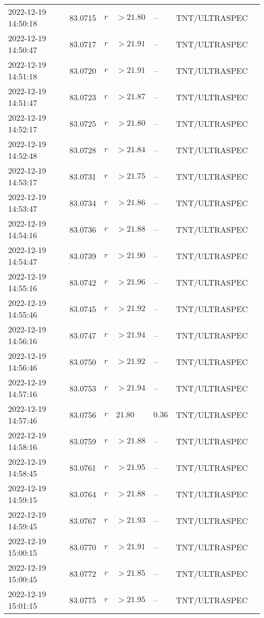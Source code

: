 \documentclass{nature_plusfigure}
\begin{document}
\begin{supplement}
\begin{center}
\begin{longtable}{lllllll}
2022-12-19 14:50:18 & 83.0715 & $r$ & $>21.80$ & -- & TNT/ULTRASPEC &  \\ 
2022-12-19 14:50:47 & 83.0717 & $r$ & $>21.91$ & -- & TNT/ULTRASPEC &  \\ 
2022-12-19 14:51:18 & 83.0720 & $r$ & $>21.91$ & -- & TNT/ULTRASPEC &  \\ 
2022-12-19 14:51:47 & 83.0723 & $r$ & $>21.87$ & -- & TNT/ULTRASPEC &  \\ 
2022-12-19 14:52:17 & 83.0725 & $r$ & $>21.80$ & -- & TNT/ULTRASPEC &  \\ 
2022-12-19 14:52:48 & 83.0728 & $r$ & $>21.84$ & -- & TNT/ULTRASPEC &  \\ 
2022-12-19 14:53:17 & 83.0731 & $r$ & $>21.75$ & -- & TNT/ULTRASPEC &  \\ 
2022-12-19 14:53:47 & 83.0734 & $r$ & $>21.86$ & -- & TNT/ULTRASPEC &  \\ 
2022-12-19 14:54:16 & 83.0736 & $r$ & $>21.88$ & -- & TNT/ULTRASPEC &  \\ 
2022-12-19 14:54:47 & 83.0739 & $r$ & $>21.90$ & -- & TNT/ULTRASPEC &  \\ 
2022-12-19 14:55:16 & 83.0742 & $r$ & $>21.96$ & -- & TNT/ULTRASPEC &  \\ 
2022-12-19 14:55:46 & 83.0745 & $r$ & $>21.92$ & -- & TNT/ULTRASPEC &  \\ 
2022-12-19 14:56:16 & 83.0747 & $r$ & $>21.94$ & -- & TNT/ULTRASPEC &  \\ 
2022-12-19 14:56:46 & 83.0750 & $r$ & $>21.92$ & -- & TNT/ULTRASPEC &  \\ 
2022-12-19 14:57:16 & 83.0753 & $r$ & $>21.94$ & -- & TNT/ULTRASPEC &  \\ 
2022-12-19 14:57:46 & 83.0756 & $r$ & $21.80$ & $0.36$ & TNT/ULTRASPEC &  \\ 
2022-12-19 14:58:16 & 83.0759 & $r$ & $>21.88$ & -- & TNT/ULTRASPEC &  \\ 
2022-12-19 14:58:45 & 83.0761 & $r$ & $>21.95$ & -- & TNT/ULTRASPEC &  \\ 
2022-12-19 14:59:15 & 83.0764 & $r$ & $>21.88$ & -- & TNT/ULTRASPEC &  \\ 
2022-12-19 14:59:45 & 83.0767 & $r$ & $>21.93$ & -- & TNT/ULTRASPEC &  \\ 
2022-12-19 15:00:15 & 83.0770 & $r$ & $>21.91$ & -- & TNT/ULTRASPEC &  \\ 
2022-12-19 15:00:45 & 83.0772 & $r$ & $>21.85$ & -- & TNT/ULTRASPEC &  \\ 
2022-12-19 15:01:15 & 83.0775 & $r$ & $>21.95$ & -- & TNT/ULTRASPEC &  \\ 

\end{longtable}
\end{center}
\end{supplement}
\end{document}
